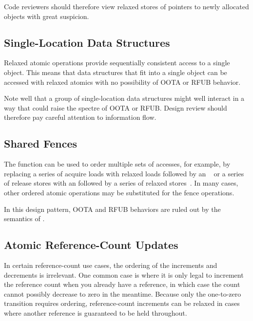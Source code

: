 \documentclass[10]{article}
\begin{document}
Code reviewers should therefore view relaxed stores of pointers to
newly allocated objects with great suspicion.

\subsection{Single-Location Data Structures}
\label{sec:Single-Location Data Structures}

Relaxed atomic operations provide sequentially consistent access to
a single object.
This means that data structures that fit into a single object can
be accessed with relaxed atomics with no possibility of OOTA or
RFUB behavior.

Note well that a group of single-location data structures might well
interact in a way that could raise the spectre of OOTA or RFUB.
Design review should therefore pay careful attention to information
flow.

\subsection{Shared Fences}
\label{sec:Shared Fences}

The  function can be used to order
multiple sets of accesses, for example, by replacing a series of
acquire loads with relaxed loads followed by an
~\cite[Section 4.1]{RaulSilvera2007WeakMemoryModel}
or a series of release stores with an
 followed by
a series of relaxed stores~\cite[Section 4.2]{RaulSilvera2007WeakMemoryModel}.
In many cases, other ordered atomic operations may be substituted for
the fence operations.

In this design pattern, OOTA and RFUB behaviors are ruled out by the semantics
of .

\subsection{Atomic Reference-Count Updates}
\label{sec:Atomic Reference-Count Updates}

In certain reference-count use cases, the ordering of the increments and
decrements is irrelevant.
One common case is where it is only legal to increment the reference
count when you already have a reference, in which case the count cannot
possibly decrease to zero in the meantime.
Because only the one-to-zero transition requires ordering, reference-count
increments can be relaxed in cases where another reference is guaranteed
to be held throughout.
\end{document}
